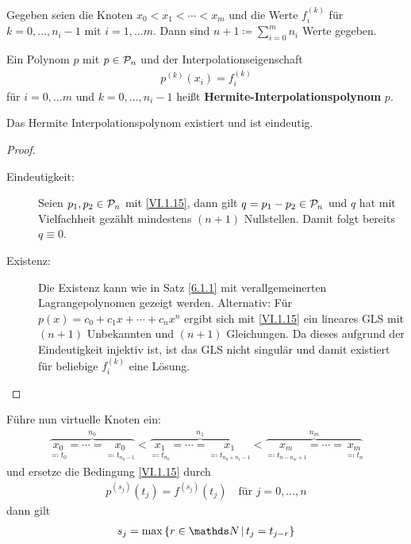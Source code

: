 
Gegeben seien die Knoten  $x_0<x_1<\dotsb <x_m$
und die Werte $ f_i^{(k)}$ für $k=0,\dotsc, n_i-1$
mit $i=1,\dotsc m$.
Dann sind $n+1\coloneqq \sum_{i=0}^{m} n_i$ Werte gegeben.

\begin{Defe}
  Ein Polynom $p$ mit $p\in \mathcal{P}_n$
  und der Interpolationseigenschaft 
  \begin{gather}
    p^{(k)}(x_i) = f_i^{(k)}
    \label{VI.1.15}
  \end{gather}
  für $i=0,\dotsc m$ und $k=0, \dotsc, n_i-1$ heißt
  \textbf{Hermite-Interpolationspolynom} $p$.
\end{Defe}


\begin{Satze}\label{6.1.12}
  Das Hermite Interpolationspolynom existiert und ist eindeutig.

  \begin{proof}~
    \begin{description}
    \item[Eindeutigkeit:] Seien $p_1,p_2\in\mathcal{P}_n$ mit
      \eqref{VI.1.15}, dann gilt $q=p_1-p_2\in\mathcal{P}_n$
      und $q$ hat mit Vielfachheit gezählt mindestens
      $(n+1)$ Nullstellen.
      Damit folgt bereits $q\equiv 0$.
    \item[Existenz:] Die Existenz kann wie in Satz \ref{6.1.1}
      mit verallgemeinerten Lagrangepolynomen gezeigt werden.
      Alternativ: Für $p(x) = c_0+c_1x+ \dotsb +c_nx^n$ ergibt sich
      mit \eqref{VI.1.15} ein lineares GLS mit $(n+1)$ Unbekannten
      und $(n+1)$ Gleichungen.
      Da dieses aufgrund der Eindeutigkeit injektiv ist, ist das GLS
      nicht singulär und damit existiert für beliebige $f_i^{(k)}$ eine Lösung.
    \end{description}
  \end{proof}
\end{Satze}


Führe nun virtuelle Knoten ein:
\begin{gather}
  \overbrace{\underset{\eqqcolon t_0}{x_0}
    =\dotsb
    = \underset{\eqqcolon t_{n_0-1}}{x_0}}^{n_0}
  <   \overbrace{\underset{\eqqcolon t_{n_0}}{x_1}=\dotsb
    = \underset{\eqqcolon t_{n_0+n_1-1}}{x_1}}^{n_1}
  <  \overbrace{\underset{\eqqcolon t_{n-n_m+1}}{x_m}=\dotsb
    = \underset{\eqqcolon t_{n}}{x_m}}^{n_m}
  \label{VI.1.16}
\end{gather}
und ersetze die Bedingung \eqref{VI.1.15} durch
\begin{gather}
  p^{(s_j)}(t_j) = f^{(s_j)}(t_j) \quad \text{für } j=0,\dotsc,n
  \label{VI.1.17}
\end{gather}
dann gilt
\begin{gather}
  s_j= \max\left\{ r\in\N\, \middle\vert\, t_j=t_{j-r}\right\}
  \label{VI.1.18}
\end{gather}

